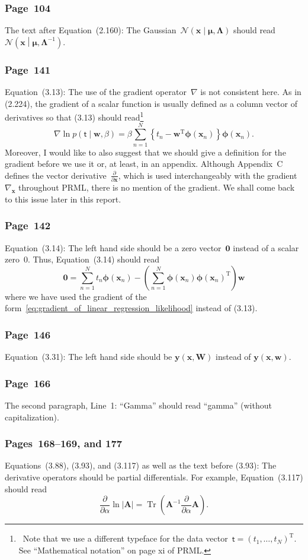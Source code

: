 \documentclass[12pt,a4paper]{article}
\newcommand{\erratum}[1]{\subsubsection*{#1}}
\begin{document}
\erratum{Page~104}
The text after Equation~(2.160):
The Gaussian~$\mathcal{N}\left(\mathbf{x}\middle|\bm{\mu}, \mathbf{\Lambda}\right)$
should read $\mathcal{N}\left(\mathbf{x}\middle|\bm{\mu}, \mathbf{\Lambda}^{-1}\right)$.

\erratum{Page~141}
Equation~(3.13):
The use of the gradient operator~$\nabla$ is not consistent here.
As in (2.224), the gradient of a scalar function is usually defined as a column vector
of derivatives so that (3.13) should read\footnote{\
Note that we use a different typeface for
the data vector~$\bm{\mathsf{t}} = \left( t_1, \dots, t_N \right)^{\operatorname{T}}$.
See ``Mathematical notation'' on page xi of PRML.}
\begin{equation}
\nabla \ln p \left( \bm{\mathsf{t}} \middle| \mathbf{w}, \beta \right) =
\beta \sum_{n=1}^{N}
\left\{ t_n - \mathbf{w}^{\operatorname{T}} \bm{\phi}\left( \mathbf{x}_n \right) \right\}
\bm{\phi}\left( \mathbf{x}_n \right) .
\label{eq:gradient_of_linear_regression_likelihood}
\end{equation}
Moreover, I would like to also suggest that we should give a definition for the gradient
before we use it or, at least, in an appendix.
Although Appendix~C defines the vector derivative~$\frac{\partial}{\partial \mathbf{x}}$,
which is used interchangeably with the gradient~$\nabla_{\mathbf{x}}$ throughout PRML,
there is no mention of the gradient.
We shall come back to this issue later in this report.

\erratum{Page~142}
Equation~(3.14):
The left hand side should be a zero vector~$\mathbf{0}$ instead of a scalar zero~$0$.
Thus, Equation~(3.14) should read
\begin{equation}
\mathbf{0} =
\sum_{n=1}^{N} t_n \bm{\phi}\left( \mathbf{x}_n \right)
- \left( \sum_{n=1}^{N}
\bm{\phi}\left(\mathbf{x}_n\right)\bm{\phi}\left(\mathbf{x}_n\right)^{\operatorname{T}} \right)
\mathbf{w}
\end{equation}
where we have used the gradient of the form~\eqref{eq:gradient_of_linear_regression_likelihood}
instead of (3.13).

\erratum{Page~146}
Equation~(3.31):
The left hand side should be $\mathbf{y}\left(\mathbf{x}, \mathbf{W}\right)$ instead of
$\mathbf{y}\left(\mathbf{x}, \mathbf{w}\right)$.

\erratum{Page~166}
The second paragraph, Line~1:
``Gamma'' should read ``gamma'' (without capitalization).

\erratum{Pages~168--169, and 177}
Equations~(3.88), (3.93), and (3.117) as well as the text before (3.93):
The derivative operators should be partial differentials.
For example, Equation~(3.117) should read
\begin{equation}
\frac{\partial}{\partial \alpha} \ln \left| \mathbf{A} \right| =
\operatorname{Tr}\left( \mathbf{A}^{-1} \frac{\partial}{\partial \alpha} \mathbf{A} \right) .
\end{equation}
\end{document}
